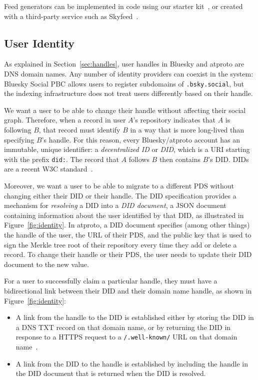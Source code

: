 \documentclass[sigconf,nonacm]{acmart}
\begin{document}
Feed generators can be implemented in code using our starter kit~\cite{FeedGeneratorKit}, or created with a third-party service such as Skyfeed~\cite{Skyfeed}.

\subsection{User Identity}\label{sec:identity}

As explained in Section~\ref{sec:handles}, user handles in Bluesky and atproto are DNS domain names.
Any number of identity providers can coexist in the system: Bluesky Social PBC allows users to register subdomains of \texttt{.bsky.social}, but the indexing infrastructure does not treat users differently based on their handle.

We want a user to be able to change their handle without affecting their social graph.
Therefore, when a record in user $A$'s repository indicates that $A$ is following $B$, that record must identify $B$ in a way that is more long-lived than specifying $B$'s handle.
For this reason, every Bluesky/atproto account has an immutable, unique identifier: a \emph{decentralized ID} or \emph{DID}, which is a URI starting with the prefix \texttt{did:}.
The record that $A$ follows $B$ then contains $B$'s DID.
DIDs are a recent W3C standard~\cite{DIDCore}.

Moreover, we want a user to be able to migrate to a different PDS without changing either their DID or their handle.
The DID specification provides a mechanism for \emph{resolving} a DID into a \emph{DID document}, a JSON document containing information about the user identified by that DID, as illustrated in Figure~\ref{fig:identity}.
In atproto, a DID document specifies (among other things) the handle of the user, the URL of their PDS, and the public key that is used to sign the Merkle tree root of their repository every time they add or delete a record.
To change their handle or their PDS, the user needs to update their DID document to the new value.

For a user to successfully claim a particular handle, they must have a bidirectional link between their DID and their domain name handle, as shown in Figure~\ref{fig:identity}:
\begin{itemize}
    \item A link from the handle to the DID is established either by storing the DID in a DNS TXT record on that domain name, or by returning the DID in response to a HTTPS request to a \texttt{/.well-known/} URL on that domain name~\cite{DomainHandle}.
    \item A link from the DID to the handle is established by including the handle in the DID document that is returned when the DID is resolved.
\end{itemize}
\end{document}
